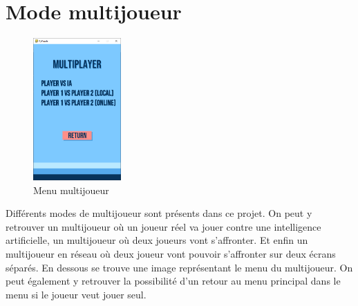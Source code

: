 \documentclass[a4paper]{report}
\begin{document}
\section{Mode multijoueur}
\begin{figure}
    \centering
    \includegraphics[width=0.3\textwidth, trim=0pt 0pt 0pt 150pt]{images/2-menumulti.png}
    \caption{Menu multijoueur}
    \vspace{-20pt}
\end{figure}
Différents modes de multijoueur sont présents dans ce projet. On peut y retrouver un multijoueur où un joueur réel va jouer contre une intelligence artificielle, un multijoueur où deux joueurs vont s'affronter. Et enfin un multijoueur en réseau où deux joueur vont pouvoir s'affronter sur deux écrans séparés. En dessous se trouve une image représentant le menu du multijoueur. On peut également y retrouver la possibilité d'un retour au menu principal dans le menu si le joueur veut jouer seul.\\
\end{document}
